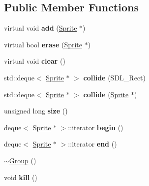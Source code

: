 \subsection*{Public Member Functions}
\begin{DoxyCompactItemize}
\item 
virtual void {\bfseries add} (\hyperlink{class_sprite}{Sprite} $\ast$)\hypertarget{class_group_a808a26e42fb31af18f1c37584bf3d972}{}\label{class_group_a808a26e42fb31af18f1c37584bf3d972}

\item 
virtual bool {\bfseries erase} (\hyperlink{class_sprite}{Sprite} $\ast$)\hypertarget{class_group_a155ede7c0abf697018b6853adb8ef41e}{}\label{class_group_a155ede7c0abf697018b6853adb8ef41e}

\item 
virtual void {\bfseries clear} ()\hypertarget{class_group_aae18ea1b059afe782eb054409d152d33}{}\label{class_group_aae18ea1b059afe782eb054409d152d33}

\item 
std\+::deque$<$ \hyperlink{class_sprite}{Sprite} $\ast$ $>$ {\bfseries collide} (S\+D\+L\+\_\+\+Rect)\hypertarget{class_group_af4bc12532edc7f9f0233913dec99579e}{}\label{class_group_af4bc12532edc7f9f0233913dec99579e}

\item 
std\+::deque$<$ \hyperlink{class_sprite}{Sprite} $\ast$ $>$ {\bfseries collide} (\hyperlink{class_sprite}{Sprite} $\ast$)\hypertarget{class_group_a13d70b578edcf2d2b93707e84d79c1af}{}\label{class_group_a13d70b578edcf2d2b93707e84d79c1af}

\item 
unsigned long {\bfseries size} ()\hypertarget{class_group_a9ccba97e193d38ab14f99d892860837e}{}\label{class_group_a9ccba97e193d38ab14f99d892860837e}

\item 
deque$<$ \hyperlink{class_sprite}{Sprite} $\ast$ $>$\+::iterator {\bfseries begin} ()\hypertarget{class_group_a58241f01b6efd8e61f8d672595b07b6b}{}\label{class_group_a58241f01b6efd8e61f8d672595b07b6b}

\item 
deque$<$ \hyperlink{class_sprite}{Sprite} $\ast$ $>$\+::iterator {\bfseries end} ()\hypertarget{class_group_a0f7e514ac1a2e8b85d9e25a589374665}{}\label{class_group_a0f7e514ac1a2e8b85d9e25a589374665}

\item 
\hyperlink{class_group_aed00a22ff227ee2657ae44a5cbcedf7c}{$\sim$\+Group} ()
\item 
void {\bfseries kill} ()\hypertarget{class_group_a0b26074a27ca9b4f404d8740743f0cb7}{}\label{class_group_a0b26074a27ca9b4f404d8740743f0cb7}

\end{DoxyCompactItemize}
